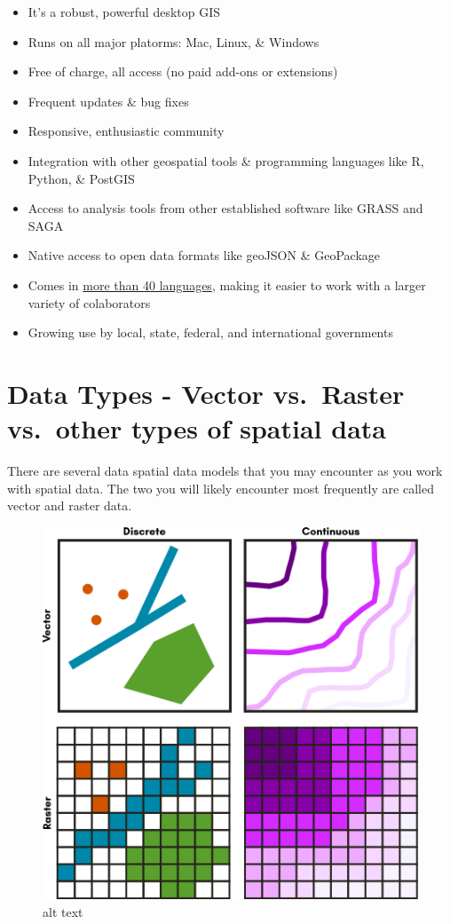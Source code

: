 \documentclass[
]{article}
\providecommand{\tightlist}{%
  \setlength{\itemsep}{0pt}\setlength{\parskip}{0pt}}
\begin{document}
\begin{itemize}
\tightlist
\item
  It's a robust, powerful desktop GIS
\item
  Runs on all major platorms: Mac, Linux, \& Windows
\item
  Free of charge, all access (no paid add-ons or extensions)
\item
  Frequent updates \& bug fixes
\item
  Responsive, enthusiastic community
\item
  Integration with other geospatial tools \& programming languages like R, Python, \& PostGIS
\item
  Access to analysis tools from other established software like GRASS and SAGA
\item
  Native access to open data formats like geoJSON \& GeoPackage
\item
  Comes in \href{https://www.qgis.org/en/site/getinvolved/translate.html}{more than 40 languages}, making it easier to work with a larger variety of colaborators
\item
  Growing use by local, state, federal, and international governments
\end{itemize}

\hypertarget{data-types---vector-vs.-raster-vs.-other-types-of-spatial-data}{%
\section{Data Types - Vector vs.~Raster vs.~other types of spatial data}\label{data-types---vector-vs.-raster-vs.-other-types-of-spatial-data}}

There are several data spatial data models that you may encounter as you work with spatial data. The two you will likely encounter most frequently are called vector and raster data.

\begin{figure}
\centering
\includegraphics{./images/geometries_data_types.png}
\caption{alt text}
\end{figure}
\end{document}
